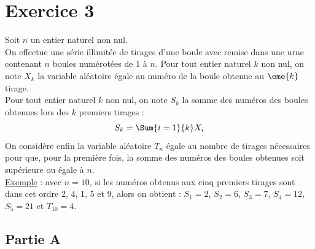 \section*{Exercice 3}
\noindent
Soit $n$ un entier naturel non nul.\\
On effectue une série illimitée de tirages d'une boule avec remise
dans une urne contenant $n$ boules numérotées de $1$ à $n$. Pour tout
entier naturel $k$ non nul, on note $X_k$ la variable aléatoire égale
au numéro de la boule obtenue au $\eme{k}$ tirage.\\
Pour tout entier naturel $k$ non nul, on note $S_k$ la somme des
numéros des boules obtenues lors des $k$ premiers tirages :
\[
S_k = \Sum{i=1}{k} X_i
\]
On considère enfin la variable aléatoire $T_n$ égale au nombre de
tirages nécessaires pour que, pour la première fois, la somme des
numéros des boules obtenues soit supérieure ou égale à $n$.\\[.2cm]
\underline{Exemple} : avec $n=10$, si les numéros obtenus aux cinq
premiers tirages sont dans cet ordre $2$, $4$, $1$, $5$ et $9$, alors
on obtient : $S_1=2$, $S_2=6$, $S_3=7$, $S_4=12$, $S_5=21$ et
$T_{10}=4$.

\subsection*{Partie A}


